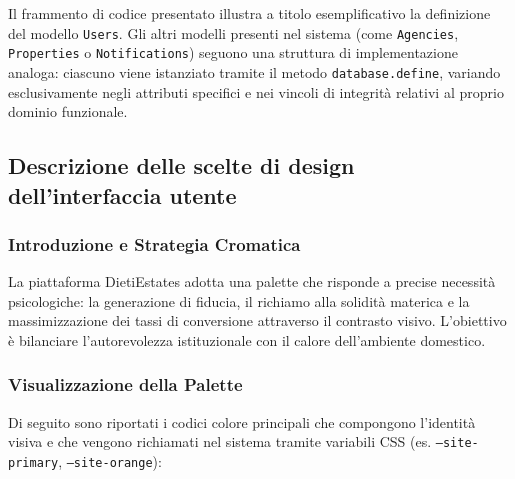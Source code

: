\documentclass{article}
\begin{document}
\begin{tcolorbox}[colback=gray!10,colframe=black,title=Nota sulla definizione dei modelli]
    Il frammento di codice presentato illustra a titolo esemplificativo la definizione del modello \texttt{Users}. Gli altri modelli presenti nel sistema (come \texttt{Agencies}, \texttt{Properties} o \texttt{Notifications}) seguono una struttura di implementazione analoga: ciascuno viene istanziato tramite il metodo \texttt{database.define}, variando esclusivamente negli attributi specifici e nei vincoli di integrità relativi al proprio dominio funzionale.
\end{tcolorbox}


\newpage

\subsection{Descrizione delle scelte di design dell'interfaccia utente}

\subsubsection{Introduzione e Strategia Cromatica}
La piattaforma DietiEstates adotta una palette che risponde a precise necessità psicologiche: la generazione di fiducia, il richiamo alla solidità materica e la massimizzazione dei tassi di conversione attraverso il contrasto visivo. L'obiettivo è bilanciare l'autorevolezza istituzionale con il calore dell'ambiente domestico.

\subsubsection{Visualizzazione della Palette}
Di seguito sono riportati i codici colore principali che compongono l'identità visiva e che vengono richiamati nel sistema tramite variabili CSS (es. \texttt{--site-primary}, \texttt{--site-orange}):
\end{document}
